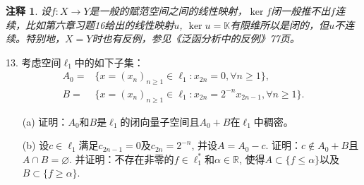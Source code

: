 \documentclass[a4paper,8pt]{ctexart}\textwidth 140mm \textheight 216mm
\newtheorem{Remark}{注释}[section]
\newcommand{\8}{\infty}
\begin{document}
\begin{Remark}
	设$f:X\to Y$是一般的赋范空间之间的线性映射，$\ker f$闭一般推不出$f$连续，比如第六章习题16给出的线性映射$u$, $\ker u=\mathbb{K}$有限维所以是闭的，但$u$不连续。特别地，$X=Y$时也有反例，参见《泛函分析中的反例》77页。
\end{Remark}

13. 考虑空间$\ell_1$中的如下子集：
\[\begin{split}
A_0=&\{x=(x_n)_{n\geq 1}\in\ell_1:x_{2n}=0,\forall n\geq 1\},\\
B=&\{x=(x_n)_{n\geq 1}\in\ell_1:x_{2n}=2^{-n}x_{2n-1},\forall n\geq 1\}.
\end{split}\]
\begin{itemize}
	\item[(a)] 证明：$A_0$和$B$是$\ell_1$的闭向量子空间且$A_0+B$在$\ell_1$中稠密。
	\item[(b)] 设$c\in\ell_1$满足$c_{2n-1}=0$及$c_{2n}=2^{-n}$, 并设$A=A_0-c$. 证明：$c\notin A_0+B$且$A\cap B=\varnothing$. 并证明：不存在非零的$f\in\ell_1^*$和$\alpha\in\mathbb{R}$, 使得$A\subset\{f\leq \alpha\}$以及$B\subset\{f\geq \alpha\}$.
\end{itemize}
\end{document}
